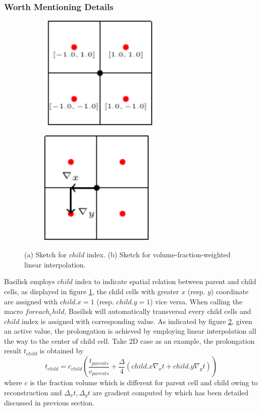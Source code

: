 \subsubsection{Worth Mentioning Details}
\begin{figure}[!htbp]
    \centering
    \begin{subfigure}[b]{0.45\textwidth}
        \centering
        \includegraphics[height=5.5cm]{./image/vof-h/child}
        \subcaption{}
        \label{fig:child_a}
    \end{subfigure}
    \begin{subfigure}[b]{0.45\textwidth}
        \centering
        \includegraphics[height=5.5cm]{./image/vof-h/childgradient}
        \subcaption{}
        \label{fig:child_b}
    \end{subfigure}
    \caption{(a) Sketch for $child$ index. (b) Sketch for volume-fraction-weighted linear interpolation.}
    \label{fig:child}
\end{figure}
Basilisk employs $child$ index to indicate spatial relation between parent and child cells, as displayed in figure \ref{fig:child_a}, the child cells with greater $x$ (resp. $y$) coordinate are assigned with $child.x = 1$ (resp. $child.y = 1$) vice versa. When calling the macro $foreach_child$, Basilisk will automatically transversal every child cells and $child$ index is assigned with corresponding value. As indicated by figure \ref{fig:child_b}, given an active value, the prolongation is achieved by employing linear interpolation all the way to the center of child cell. Take 2D case as an example, the prolongation result $t_{child}$ is obtained by 
\begin{equation}\label{equ:prolongation}
    t_{child} = c_{child}(\frac{t_{parents}}{c_{parents}} + \frac{\Delta}{4}(child.x\nabla_xt+child.y\nabla_yt))
\end{equation}
where $c$ is the fraction volume which is different for parent cell and child owing to reconstruction and $\Delta_xt,\Delta_yt$ are gradient computed by  which has been detailed discussed in previous section.

